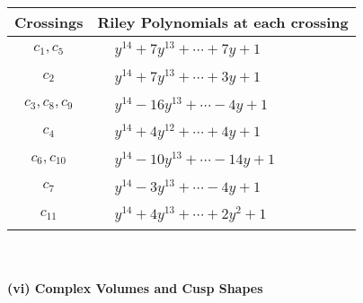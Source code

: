 \documentclass[1p]{elsarticle_modified}
\theoremstyle{definition}
\begin{document}
\begin{tabular}{m{50pt}|m{274pt}}
Crossings & \hspace{64pt}Riley Polynomials at each crossing \\
\hline $$\begin{aligned}c_{1},c_{5}\end{aligned}$$&$\begin{aligned}
&y^{14}+7 y^{13}+\cdots+7 y+1
\end{aligned}$\\
\hline $$\begin{aligned}c_{2}\end{aligned}$$&$\begin{aligned}
&y^{14}+7 y^{13}+\cdots+3 y+1
\end{aligned}$\\
\hline $$\begin{aligned}c_{3},c_{8},c_{9}\end{aligned}$$&$\begin{aligned}
&y^{14}-16 y^{13}+\cdots-4 y+1
\end{aligned}$\\
\hline $$\begin{aligned}c_{4}\end{aligned}$$&$\begin{aligned}
&y^{14}+4 y^{12}+\cdots+4 y+1
\end{aligned}$\\
\hline $$\begin{aligned}c_{6},c_{10}\end{aligned}$$&$\begin{aligned}
&y^{14}-10 y^{13}+\cdots-14 y+1
\end{aligned}$\\
\hline $$\begin{aligned}c_{7}\end{aligned}$$&$\begin{aligned}
&y^{14}-3 y^{13}+\cdots-4 y+1
\end{aligned}$\\
\hline $$\begin{aligned}c_{11}\end{aligned}$$&$\begin{aligned}
&y^{14}+4 y^{13}+\cdots+2 y^2+1
\end{aligned}$\\
\hline
\end{tabular}\\~\\
\newpage\flushleft \textbf{(vi) Complex Volumes and Cusp Shapes}
\end{document}
